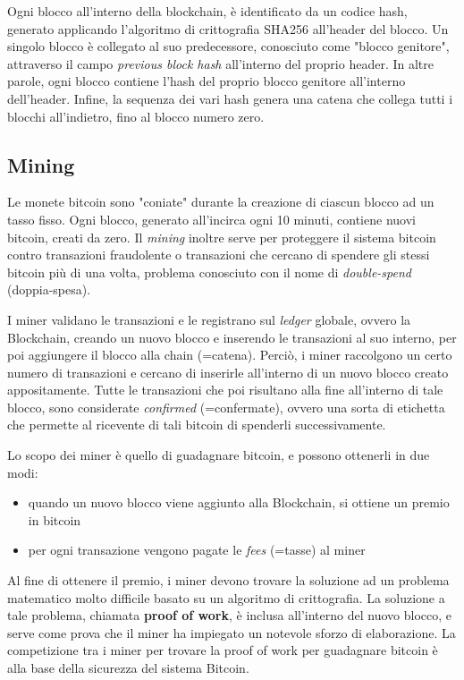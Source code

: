Ogni blocco all'interno della blockchain, è identificato da un codice hash, generato applicando l'algoritmo di crittografia SHA256 all'header del blocco. Un singolo blocco è collegato al suo predecessore, conosciuto come "blocco genitore", attraverso il campo \textit{previous block hash} all'interno del proprio header. In altre parole, ogni blocco contiene l'hash del proprio blocco genitore all'interno dell'header. Infine, la sequenza dei vari hash genera una catena che collega tutti i blocchi all'indietro, fino al blocco numero zero.\cite{antonopoulos2014mastering}

\subsection{Mining}

Le monete bitcoin sono "coniate" durante la creazione di ciascun blocco ad un tasso fisso. Ogni blocco, generato all'incirca ogni 10 minuti, contiene nuovi bitcoin, creati da zero.
Il \textit{mining} inoltre serve per proteggere il sistema bitcoin contro transazioni fraudolente o transazioni che cercano di spendere gli stessi bitcoin più di una volta, problema conosciuto con il nome di \textit{double-spend} (doppia-spesa).

I miner validano le transazioni e le registrano sul \textit{ledger} globale, ovvero la Blockchain, creando un nuovo blocco e inserendo le transazioni al suo interno, per poi aggiungere il blocco alla chain (=catena). Perciò, i miner raccolgono un certo numero di transazioni e cercano di inserirle all'interno di un nuovo blocco creato appositamente. Tutte le transazioni che poi risultano alla fine all'interno di tale blocco, sono considerate \textit{confirmed} (=confermate), ovvero una sorta di etichetta che permette al ricevente di tali bitcoin di spenderli successivamente.

Lo scopo dei miner è quello di guadagnare bitcoin, e possono ottenerli in due modi: 
\begin{itemize}
	\item quando un nuovo blocco viene aggiunto alla Blockchain, si ottiene un premio in bitcoin
	\item per ogni transazione vengono pagate le \textit{fees} (=tasse) al miner
\end{itemize}

Al fine di ottenere il premio, i miner devono trovare la soluzione ad un problema matematico molto difficile basato su un algoritmo di crittografia. La soluzione a tale problema, chiamata \textbf{proof of work}, è inclusa all'interno del nuovo blocco, e serve come prova che il miner ha impiegato un notevole sforzo di elaborazione. La competizione tra i miner per trovare la proof of work per guadagnare bitcoin è alla base della sicurezza del sistema Bitcoin.

